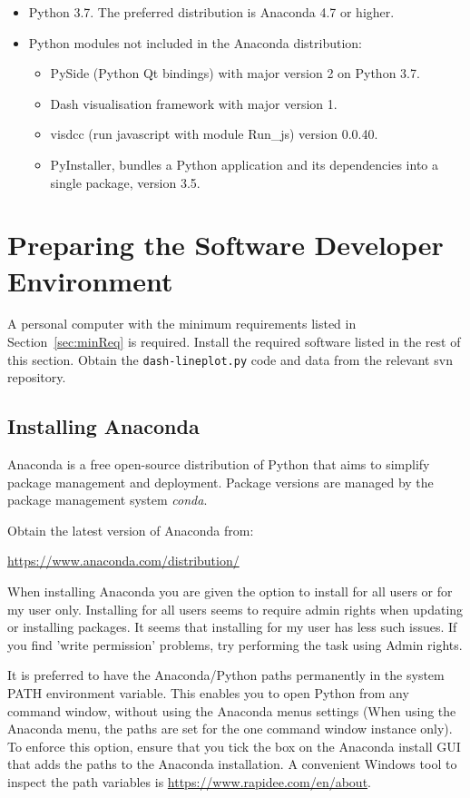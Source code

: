 \begin{itemize}
  \item Python 3.7. The preferred distribution is Anaconda 4.7 or higher.
  \item Python modules not included in the Anaconda distribution:
  \begin{itemize}
  \item PySide (Python Qt bindings) with major version 2 on Python 3.7.
  \item Dash visualisation framework with major version 1.
  \item visdcc (run javascript with module Run\_js) version 0.0.40.
  \item PyInstaller, bundles a Python application and its dependencies into a single package, version 3.5.
  \end{itemize}
\end{itemize}


\section{Preparing the Software Developer Environment}
\label{sec:softwaredev}

A personal computer with the minimum requirements listed in Section~\ref{sec:minReq} is required. Install the required software listed in the rest of this section.
Obtain the \texttt{dash-lineplot.py} code and data from the relevant \ac{svn} repository.

\subsection{Installing Anaconda}

Anaconda is a free open-source distribution of Python that aims to simplify package management and deployment. Package versions are managed by the package management system \textsl{conda}.

Obtain the latest version of Anaconda from:

\url{https://www.anaconda.com/distribution/}


When installing Anaconda you are given the option to install for all users or for my user only.  Installing for all users seems to require admin rights when updating or installing packages. It seems that installing for my user has less such issues.  If you find 'write permission' problems, try performing the task using Admin rights.


It is preferred to have the Anaconda/Python paths permanently in the system PATH environment variable. This enables you to open Python from any command window, without using the Anaconda menus settings (When using the Anaconda menu, the paths are set for the one command window instance only).
To enforce this option, ensure that you tick the box on the Anaconda install \ac{GUI} that adds the paths to the Anaconda installation. A convenient Windows tool to inspect the path variables is \url{https://www.rapidee.com/en/about}.

